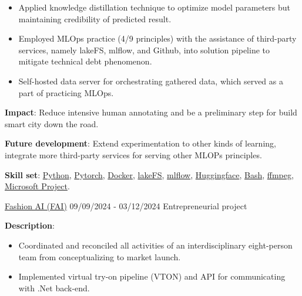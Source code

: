 \documentclass{src/preamble/doc_class}
\begin{document}
\begin{MainPart}
{\begin{itemize}[label=$\bullet$,topsep=-.5ex,itemsep=-0.5ex]
            	\item Applied knowledge distillation technique to optimize model parameters but maintaining credibility of predicted result.
            	
            	\item Employed MLOps practice (4/9 principles) with the assistance of third-party services, namely lakeFS, mlflow, and Github, into solution pipeline to mitigate technical debt phenomenon.
            	
            	\item Self-hosted data server for orchestrating gathered data, which served as a part of practicing MLOps.
            \end{itemize}
            \vspace{.15cm}
            
            \textbf{Impact}: Reduce intensive human annotating and be a preliminary step for build smart city down the road.
            \vspace{.15cm}
            
            \textbf{Future development}: Extend experimentation to other kinds of learning, integrate more third-party services for serving other MLOPs principles.
            \vspace{.1cm}

            \textbf{Skill set}: \href{https://www.python.org/}{Python}, \href{https://pytorch.org/}{Pytorch}, \href{https://www.docker.com/}{Docker}, \href{https://lakefs.io/}{lakeFS}, \href{https://mlflow.org/}{mlflow}, \href{https://huggingface.co/}{Huggingface}, \href{https://www.gnu.org/software/bash/}{Bash}, \href{https://ffmpeg.org/}{ffmpeg}, \href{https://www.microsoft.com/en/microsoft-365/planner/microsoft-planner?market=af}{Microsoft Project}.
        }
		
		\Experience
		{\ColorHighlight}
		{\href{https://fashion-ai-innovation.vercel.app/}{Fashion AI (FAI)}}
		{09/09/2024 - 03/12/2024}
		{Entrepreneurial project}
		{
			\textbf{Description}:
			\begin{itemize}[label=$\bullet$,topsep=-.5ex,itemsep=-0.5ex]
				\item Coordinated and reconciled all activities of an interdisciplinary eight-person team from conceptualizing to market launch.
				
				\item Implemented virtual try-on pipeline (VTON) and API for communicating with .Net back-end.
				

\end{itemize}}
\end{MainPart}
\end{document}
